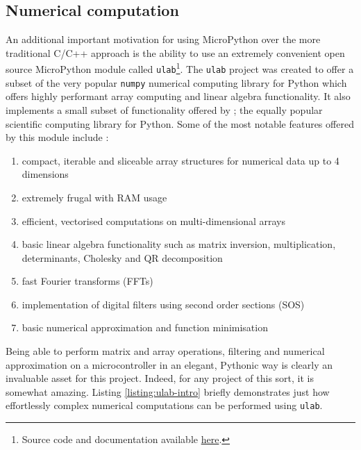 \subsection{Numerical computation}
An additional important motivation for using MicroPython over the more traditional C/C++ approach is the ability to use an extremely convenient open source MicroPython module called \texttt{ulab}\footnote{Source code and documentation available \href{https://github.com/v923z/micropython-ulab}{here}.}. The \texttt{ulab} project was created to offer a subset of the very popular \texttt{numpy} numerical computing library for Python which offers highly performant array computing and linear algebra functionality. It also implements a small subset of functionality offered by ; the equally popular scientific computing library for Python. Some of the most notable features offered by this module include \cite{ulab}:
\begin{enumerate}
    \item compact, iterable and sliceable array structures for numerical data up to 4 dimensions
    \item extremely frugal with RAM usage
    \item efficient, vectorised computations on multi-dimensional arrays
    \item basic linear algebra functionality such as matrix inversion, multiplication, determinants, Cholesky and QR decomposition
    \item fast Fourier transforms (FFTs)
    \item implementation of digital filters using second order sections (SOS)
    \item basic numerical approximation and function minimisation
\end{enumerate}
Being able to perform matrix and array operations, filtering and numerical approximation on a microcontroller in an elegant, Pythonic way is clearly an invaluable asset for this project. Indeed, for any project of this sort, it is somewhat amazing. Listing \ref{listing:ulab-intro} briefly demonstrates just how effortlessly complex numerical computations can be performed using \texttt{ulab}.

